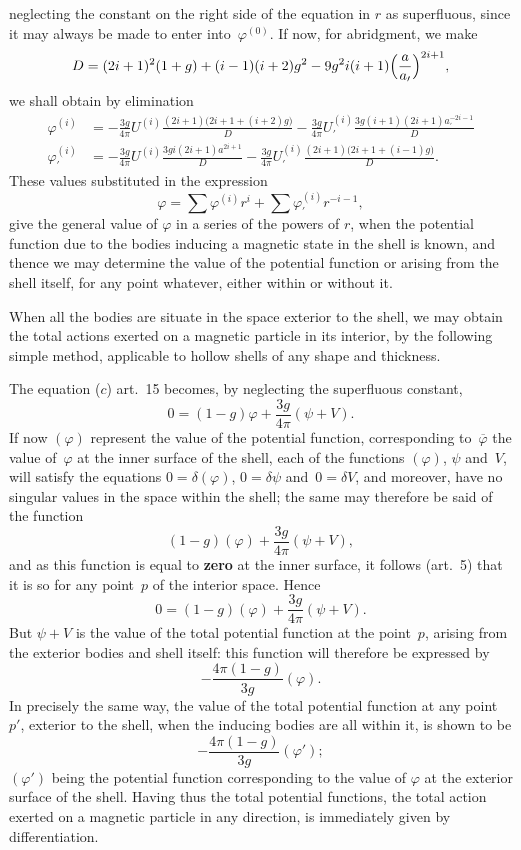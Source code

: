 \documentclass[12pt,notitlepage]{amsart}
\let\Emphasis\textbf
\renewcommand{\phi}{\varphi}
\begin{document}
neglecting the constant on the right side of the equation in $r$ as superfluous,
since it may always be made to enter into~$\phi^{(0)}$. If now, for abridgment,
we make
\[
D=(2i+1)^2(1+g)+(i-1)(i+2)g^2-9g^2i(i+1)\Bigl(\frac{a}{a_\prime}\Bigr)^{2i+1},
\]
we shall obtain by elimination
\[
\begin{aligned}
\phi^{(i)} &=
-\frac{3g}{4\pi}U^{(i)}\frac{(2i+1)\bigl(2i+1+(i+2)g\bigr)}{D}
-\frac{3g}{4\pi}U_\prime^{(i)}\frac{3g(i+1)(2i+1)a_\prime^{-2i-1}}{D}\\
\phi_\prime^{(i)} &=
-\frac{3g}{4\pi}U^{(i)}\frac{3gi(2i+1)a^{2i+1}}{D}
-\frac{3g}{4\pi}U_\prime^{(i)}\frac{(2i+1)\bigl(2i+1+(i-1)g\bigr)}{D}.
\end{aligned}
\]
These values substituted in the expression
\[
\phi=\sum\phi^{(i)}r^i+\sum\phi_\prime^{(i)}r^{-i-1},
\]
give the general value of $\phi$ in a series of the powers of $r$,
when the potential
function due to the bodies inducing a magnetic state in the shell is known,
and thence we may determine the value of the potential function or arising
from the shell itself, for any point whatever, either within or without it.

When all the bodies are situate in the space exterior to the shell, we
may obtain the total actions exerted on a magnetic particle in its interior, by
the following simple method, applicable to hollow shells of any shape and
thickness.

The equation ($c$) art.~15 becomes, by neglecting the superfluous constant,
\[
0=(1-g)\phi+\frac{3g}{4\pi}(\psi+V).
\]
If now $(\phi)$ represent the value of the potential function,
corresponding to~$\overline\phi$
the value of~$\phi$ at the inner surface of the shell,
each of the functions $(\phi)$,
$\psi$ and~$V$, will satisfy the equations
$0=\delta(\phi)$, $0=\delta\psi$ and~$0=\delta V$, and
moreover, have no singular values in the space within the shell; the same
may therefore be said of the function
\[
(1-g)(\phi)+\frac{3g}{4\pi}(\psi+V),
\]
and as this function is equal to \Emphasis{zero} at the inner surface,
it follows (art.~5)
that it is so for any point~$p$ of the interior space. Hence
\[
0=(1-g)(\phi)+\frac{3g}{4\pi}(\psi+V).
\]
But $\psi+V$ is the value of the total potential function at the point~$p$,
arising
from the exterior bodies and shell itself: this function will therefore be 
expressed by
\[
-\frac{4\pi(1-g)}{3g}(\phi).
\]
In precisely the same way, the value of the total potential function at any
point~$p'$, exterior to the shell,
when the inducing bodies are all within it, is
shown to be
\[
-\frac{4\pi(1-g)}{3g}(\phi');
\]
$(\phi')$ being the potential function
corresponding to the value of $\phi$ at the exterior
surface of the shell. Having thus the total potential functions, the total
action exerted on a magnetic particle in any direction, is immediately given
by differentiation.
\end{document}
